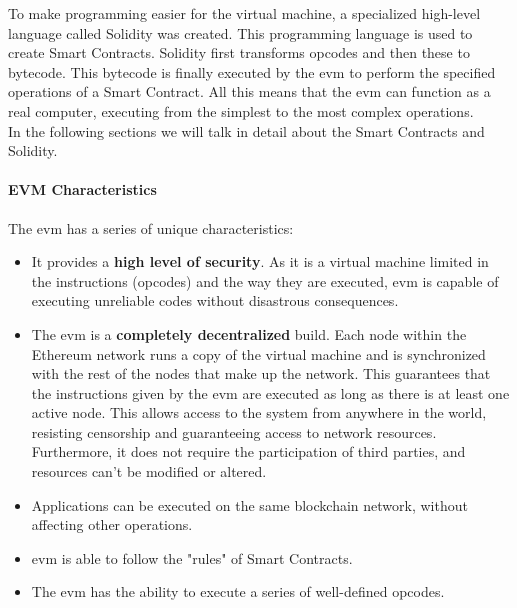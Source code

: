 \documentclass[a4paper, 12pt]{article} %
\begin{document}
                To make programming easier for the virtual machine, a specialized high-level language called Solidity was created. This programming language is used to create Smart Contracts. Solidity first transforms opcodes and then these to bytecode. This bytecode is finally executed by the \acrshort{evm} to perform the specified operations of a  Smart Contract. All this means that the \acrshort{evm} can function as a real computer, executing from the simplest to the most complex operations.\\
                
                In the following sections we will talk in detail about the Smart Contracts and Solidity.
                
            \paragraph{EVM Characteristics}
                The \acrshort{evm} has a series of unique characteristics\cite{ethereumGavin,ethereumDocu}:
                \begin{itemize}
                    \item It provides a \textbf{high level of security}. As it is a virtual machine limited in the instructions (opcodes) and the way they are executed, \acrshort{evm} is capable of executing unreliable codes without disastrous consequences.
                    \item The \acrshort{evm} is a \textbf{completely decentralized} build. Each node within the Ethereum network runs a copy of the virtual machine and is synchronized with the rest of the nodes that make up the network. This guarantees that the instructions given by the \acrshort{evm} are executed as long as there is at least one active node. This allows access to the system from anywhere in the world, resisting censorship and guaranteeing access to network resources. Furthermore, it does not require the participation of third parties, and resources can't be modified or altered.
                    \item Applications can be executed on the same blockchain network, without affecting other operations.
                    \item \acrshort{evm} is able to follow the "rules" of Smart Contracts.
                    \item The \acrshort{evm} has the ability to execute a series of well-defined opcodes.
                \end{itemize}
                
\end{document}
